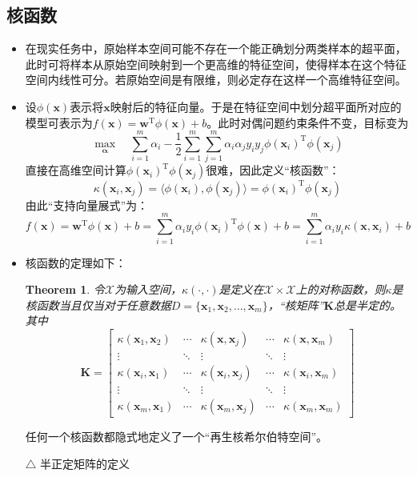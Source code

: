 \documentclass{ctexart}
\newtheorem{theorem}{Theorem}
\begin{document}
				\subsection{核函数}
					\begin{itemize}
						\item 在现实任务中，原始样本空间可能不存在一个能正确划分两类样本的超平面，此时可将样本从原始空间映射到一个更高维的特征空间，使得样本在这个特征空间内线性可分。若原始空间是有限维，则必定存在这样一个高维特征空间。
						\item 设$\phi(\bm{x})$表示将$\bm{x}$映射后的特征向量。于是在特征空间中划分超平面所对应的模型可表示为$f(\bm{x})=\bm{w}^{\mathrm{T}}\phi(\bm{x})+b$。此时对偶问题约束条件不变，目标变为\[\max\limits_{\bm{\alpha}}\quad\sum_{i=1}^{m}\alpha_i-\frac{1}{2}\sum_{i=1}^{m}\sum_{j=1}^{m}\alpha_i\alpha_jy_iy_j\phi(\bm{x}_i)^{\mathrm{T}}\phi(\bm{x}_j)\]直接在高维空间计算$\phi(\bm{x}_i)^{\mathrm{T}}\phi(\bm{x}_j)$很难，因此定义``核函数''：\[\kappa(\bm{x}_i,\bm{x}_j)=\langle\phi(\bm{x}_i),\phi(\bm{x}_j)\rangle=\phi(\bm{x}_i)^{\mathrm{T}}\phi(\bm{x}_j)\]由此``支持向量展式''为：\[f(\bm{x})=\bm{w}^{\mathrm{T}}\phi(\bm{x})+b=\sum_{i=1}^{m}\alpha_iy_i\phi(\bm{x}_i)^{\mathrm{T}}\phi(\bm{x})+b=\sum_{i=1}^{m}\alpha_iy_i\kappa(\bm{x},\bm{x}_i)+b\]
						\item 核函数的定理如下：\begin{theorem}
							令$\mathcal{X}$为输入空间，$\kappa(\cdot,\cdot)$是定义在$\mathcal{X}\times\mathcal{X}$上的对称函数，则$\kappa$是核函数当且仅当对于任意数据$D=\{\bm{x}_1,\bm{x}_2,\dots,\bm{x}_m\}$，``核矩阵''$\mathbf{K}$总是半定的。其中\[\mathbf{K}=\left[\begin{matrix}
							\kappa(\bm{x}_1,\bm{x}_2) & \cdots & \kappa(\bm{x},\bm{x}_j) & \cdots & \kappa(\bm{x},\bm{x}_m) \\
							\vdots & \ddots & \vdots & \ddots & \vdots \\
							\kappa(\bm{x}_i,\bm{x}_1) & \cdots & \kappa(\bm{x}_i,\bm{x}_j) & \cdots & \kappa(\bm{x}_i,\bm{x}_m) \\
							\vdots & \ddots & \vdots & \ddots & \vdots \\
							\kappa(\bm{x}_m, \bm{x}_1) & \cdots & \kappa(\bm{x}_m,\bm{x}_j) & \cdots & \kappa(\bm{x}_m,\bm{x}_m)
							\end{matrix}\right]\]
						\end{theorem}
						任何一个核函数都隐式地定义了一个``再生核希尔伯特空间''。\begin{framed}
							$\triangle$ 半正定矩阵的定义\begin{itemize}

\end{itemize}
\end{framed}
\end{itemize}
\end{document}

